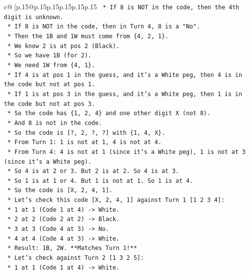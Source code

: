 \documentclass{article}
\begin{document}
{\begin{supertabular}{c@{$\;$}|p{.15\linewidth}@{}p{.15\linewidth}p{.15\linewidth}p{.15\linewidth}p{.15\linewidth}p{.15\linewidth}}
{{{\texttt{        *   If 8 is NOT in the code, then the 4th digit is unknown.} \\
\texttt{        *   If 8 is NOT in the code, then in Turn 4, 8 is a "No".} \\
\texttt{        *   Then the 1B and 1W must come from \{4, 2, 1\}.} \\
\texttt{        *   We know 2 is at pos 2 (Black).} \\
\texttt{        *   So we have 1B (for 2).} \\
\texttt{        *   We need 1W from \{4, 1\}.} \\
\texttt{        *   If 4 is at pos 1 in the guess, and it's a White peg, then 4 is in the code but not at pos 1.} \\
\texttt{        *   If 1 is at pos 3 in the guess, and it's a White peg, then 1 is in the code but not at pos 3.} \\
\texttt{        *   So the code has \{1, 2, 4\} and one other digit X (not 8).} \\
\texttt{        *   And 8 is not in the code.} \\
\texttt{        *   So the code is {[}?, 2, ?, ?{]} with \{1, 4, X\}.} \\
\texttt{        *   From Turn 1: 1 is not at 1, 4 is not at 4.} \\
\texttt{        *   From Turn 4: 4 is not at 1 (since it's a White peg), 1 is not at 3 (since it's a White peg).} \\
\texttt{        *   So 4 is at 2 or 3. But 2 is at 2. So 4 is at 3.} \\
\texttt{        *   So 1 is at 1 or 4. But 1 is not at 1. So 1 is at 4.} \\
\texttt{        *   So the code is {[}X, 2, 4, 1{]}.} \\
\texttt{        *   Let's check this code {[}X, 2, 4, 1{]} against Turn 1 {[}1 2 3 4{]}:} \\
\texttt{            *   1 at 1 (Code 1 at 4) {-}> White.} \\
\texttt{            *   2 at 2 (Code 2 at 2) {-}> Black.} \\
\texttt{            *   3 at 3 (Code 4 at 3) {-}> No.} \\
\texttt{            *   4 at 4 (Code 4 at 3) {-}> White.} \\
\texttt{            *   Result: 1B, 2W. **Matches Turn 1!**} \\
\texttt{        *   Let's check against Turn 2 {[}1 3 2 5{]}:} \\
\texttt{            *   1 at 1 (Code 1 at 4) {-}> White.} \\
}}}
\end{supertabular}}
\end{document}
